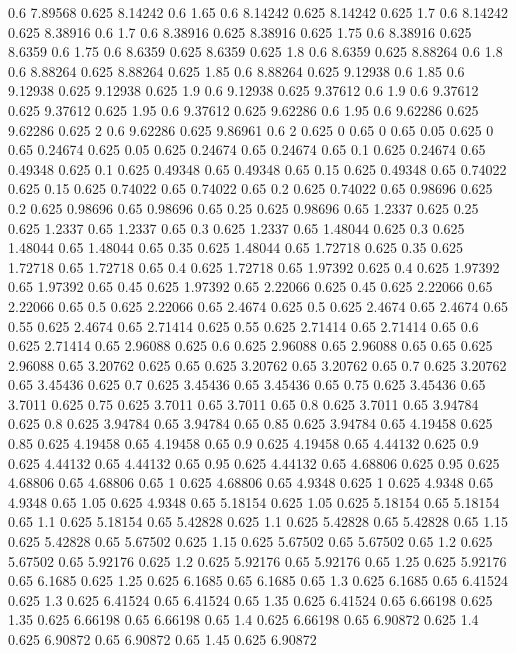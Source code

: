 0.6 7.89568
0.625 8.14242
0.6 1.65
0.6 8.14242
0.625 8.14242
0.625 1.7
0.6 8.14242
0.625 8.38916
0.6 1.7
0.6 8.38916
0.625 8.38916
0.625 1.75
0.6 8.38916
0.625 8.6359
0.6 1.75
0.6 8.6359
0.625 8.6359
0.625 1.8
0.6 8.6359
0.625 8.88264
0.6 1.8
0.6 8.88264
0.625 8.88264
0.625 1.85
0.6 8.88264
0.625 9.12938
0.6 1.85
0.6 9.12938
0.625 9.12938
0.625 1.9
0.6 9.12938
0.625 9.37612
0.6 1.9
0.6 9.37612
0.625 9.37612
0.625 1.95
0.6 9.37612
0.625 9.62286
0.6 1.95
0.6 9.62286
0.625 9.62286
0.625 2
0.6 9.62286
0.625 9.86961
0.6 2
0.625 0
0.65 0
0.65 0.05
0.625 0
0.65 0.24674
0.625 0.05
0.625 0.24674
0.65 0.24674
0.65 0.1
0.625 0.24674
0.65 0.49348
0.625 0.1
0.625 0.49348
0.65 0.49348
0.65 0.15
0.625 0.49348
0.65 0.74022
0.625 0.15
0.625 0.74022
0.65 0.74022
0.65 0.2
0.625 0.74022
0.65 0.98696
0.625 0.2
0.625 0.98696
0.65 0.98696
0.65 0.25
0.625 0.98696
0.65 1.2337
0.625 0.25
0.625 1.2337
0.65 1.2337
0.65 0.3
0.625 1.2337
0.65 1.48044
0.625 0.3
0.625 1.48044
0.65 1.48044
0.65 0.35
0.625 1.48044
0.65 1.72718
0.625 0.35
0.625 1.72718
0.65 1.72718
0.65 0.4
0.625 1.72718
0.65 1.97392
0.625 0.4
0.625 1.97392
0.65 1.97392
0.65 0.45
0.625 1.97392
0.65 2.22066
0.625 0.45
0.625 2.22066
0.65 2.22066
0.65 0.5
0.625 2.22066
0.65 2.4674
0.625 0.5
0.625 2.4674
0.65 2.4674
0.65 0.55
0.625 2.4674
0.65 2.71414
0.625 0.55
0.625 2.71414
0.65 2.71414
0.65 0.6
0.625 2.71414
0.65 2.96088
0.625 0.6
0.625 2.96088
0.65 2.96088
0.65 0.65
0.625 2.96088
0.65 3.20762
0.625 0.65
0.625 3.20762
0.65 3.20762
0.65 0.7
0.625 3.20762
0.65 3.45436
0.625 0.7
0.625 3.45436
0.65 3.45436
0.65 0.75
0.625 3.45436
0.65 3.7011
0.625 0.75
0.625 3.7011
0.65 3.7011
0.65 0.8
0.625 3.7011
0.65 3.94784
0.625 0.8
0.625 3.94784
0.65 3.94784
0.65 0.85
0.625 3.94784
0.65 4.19458
0.625 0.85
0.625 4.19458
0.65 4.19458
0.65 0.9
0.625 4.19458
0.65 4.44132
0.625 0.9
0.625 4.44132
0.65 4.44132
0.65 0.95
0.625 4.44132
0.65 4.68806
0.625 0.95
0.625 4.68806
0.65 4.68806
0.65 1
0.625 4.68806
0.65 4.9348
0.625 1
0.625 4.9348
0.65 4.9348
0.65 1.05
0.625 4.9348
0.65 5.18154
0.625 1.05
0.625 5.18154
0.65 5.18154
0.65 1.1
0.625 5.18154
0.65 5.42828
0.625 1.1
0.625 5.42828
0.65 5.42828
0.65 1.15
0.625 5.42828
0.65 5.67502
0.625 1.15
0.625 5.67502
0.65 5.67502
0.65 1.2
0.625 5.67502
0.65 5.92176
0.625 1.2
0.625 5.92176
0.65 5.92176
0.65 1.25
0.625 5.92176
0.65 6.1685
0.625 1.25
0.625 6.1685
0.65 6.1685
0.65 1.3
0.625 6.1685
0.65 6.41524
0.625 1.3
0.625 6.41524
0.65 6.41524
0.65 1.35
0.625 6.41524
0.65 6.66198
0.625 1.35
0.625 6.66198
0.65 6.66198
0.65 1.4
0.625 6.66198
0.65 6.90872
0.625 1.4
0.625 6.90872
0.65 6.90872
0.65 1.45
0.625 6.90872
